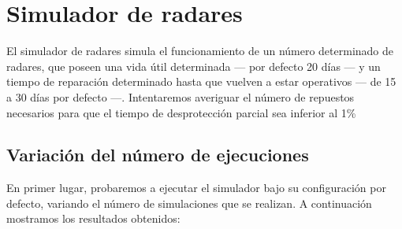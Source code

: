 \chapter{Simulador de radares}

El simulador de radares simula el funcionamiento de un número determinado de radares, que poseen una vida útil determinada --- por defecto 20 días --- y un tiempo de reparación determinado hasta que vuelven a estar operativos --- de 15 a 30 días por defecto ---. Intentaremos averiguar el número de repuestos necesarios para que el tiempo de desprotección parcial sea inferior al 1\%

\section{Variación del número de ejecuciones}
En primer lugar, probaremos a ejecutar el simulador bajo su configuración por defecto, variando el número de simulaciones que se realizan. A continuación mostramos los resultados obtenidos:


